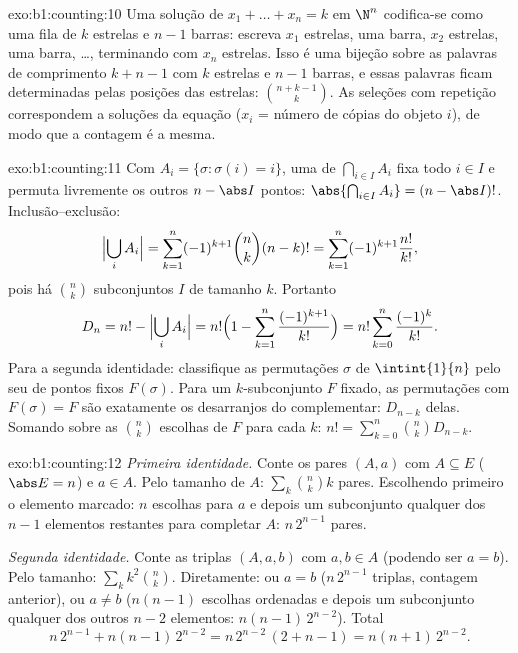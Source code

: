 \begin{solution}{exo:b1:counting:10}
Uma solução de $x_1 + \dots + x_n = k$ em $\N^n$ codifica-se como uma fila de
$k$ estrelas e $n - 1$ barras: escreva $x_1$ estrelas, uma barra, $x_2$
estrelas, uma barra, \dots, terminando com $x_n$ estrelas. Isso é uma
bijeção sobre as palavras de comprimento $k + n - 1$ com $k$ estrelas e
$n - 1$ barras, e essas palavras ficam determinadas pelas posições das
estrelas: $\binom{n + k - 1}{k}$. As seleções com repetição correspondem a
soluções da equação ($x_i$ = número de cópias do objeto $i$), de modo que
a contagem é a mesma.
\end{solution}

\begin{solution}{exo:b1:counting:11}
Com $A_i = \{\sigma : \sigma(i) = i\}$, uma  de
$\bigcap_{i \in I} A_i$ fixa todo $i \in I$ e permuta livremente os outros
$n - \abs I$ pontos: $\abs{\bigcap_{i \in I} A_i} =
(n - \abs I)!$. Inclusão--exclusão:
\[
\Bigl|\bigcup_i A_i\Bigr|
= \sum_{k=1}^{n} (-1)^{k+1} \binom nk (n-k)!
= \sum_{k=1}^{n} (-1)^{k+1} \frac{n!}{k!} ,
\]
pois há $\binom nk$ subconjuntos $I$ de tamanho $k$. Portanto
\[
D_n = n! - \Bigl|\bigcup_i A_i\Bigr|
= n!\Bigl(1 - \sum_{k=1}^{n} \frac{(-1)^{k+1}}{k!}\Bigr)
= n! \sum_{k=0}^{n} \frac{(-1)^k}{k!} .
\]
Para a segunda identidade: classifique as permutações $\sigma$ de
$\intint{1}{n}$ pelo seu  de pontos fixos $F(\sigma)$. Para um
$k$-subconjunto $F$ fixado, as permutações com $F(\sigma) = F$ são exatamente
os desarranjos do complementar: $D_{n-k}$ delas. Somando sobre as
$\binom nk$ escolhas de $F$ para cada $k$:
$n! = \sum_{k=0}^{n} \binom nk D_{n-k}$.
\end{solution}

\begin{solution}{exo:b1:counting:12}
\emph{Primeira identidade.} Conte os pares $(A, a)$ com $A \subseteq E$
($\abs E = n$) e $a \in A$. Pelo tamanho de $A$: $\sum_k \binom nk k$
pares. Escolhendo primeiro o elemento marcado: $n$ escolhas para $a$ e
depois um subconjunto qualquer dos $n - 1$ elementos restantes para
completar $A$: $n\,2^{n-1}$ pares.

\emph{Segunda identidade.} Conte as triplas $(A, a, b)$ com $a, b \in
A$
(podendo ser $a = b$). Pelo tamanho: $\sum_k k^2 \binom nk$. Diretamente:
ou $a = b$ ($n\,2^{n-1}$ triplas, contagem anterior), ou $a \neq b$
($n(n-1)$ escolhas ordenadas e depois um subconjunto qualquer dos outros
$n - 2$ elementos: $n(n-1)\,2^{n-2}$). Total
\[
n\,2^{n-1} + n(n-1)\,2^{n-2} = n\,2^{n-2}\,(2 + n - 1)
= n(n+1)\,2^{n-2} .
\]
\end{solution}

